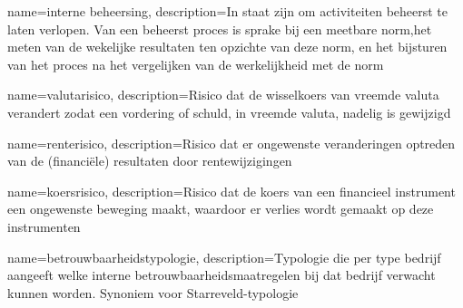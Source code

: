{
    name=interne beheersing,
    description={In staat zijn om activiteiten beheerst te laten verlopen. Van een beheerst proces is sprake bij een meetbare norm,het meten van de wekelijke resultaten ten opzichte van deze norm, en het bijsturen van het proces na het vergelijken van de werkelijkheid met de norm}
}

{
    name=valutarisico,
    description={Risico dat de wisselkoers van vreemde valuta verandert zodat een vordering of schuld, in vreemde valuta, nadelig is gewijzigd}
}

{
    name=renterisico,
    description={Risico dat er ongewenste veranderingen optreden van de (financiële) resultaten door rentewijzigingen}
}

{
    name=koersrisico,
    description={Risico dat de koers van een financieel instrument een ongewenste beweging maakt, waardoor er verlies wordt gemaakt op deze instrumenten}
}

{
    name=betrouwbaarheidstypologie,
    description={Typologie die per type bedrijf aangeeft welke interne betrouwbaarheidsmaatregelen bij dat bedrijf verwacht kunnen worden. Synoniem voor Starreveld-typologie}
}